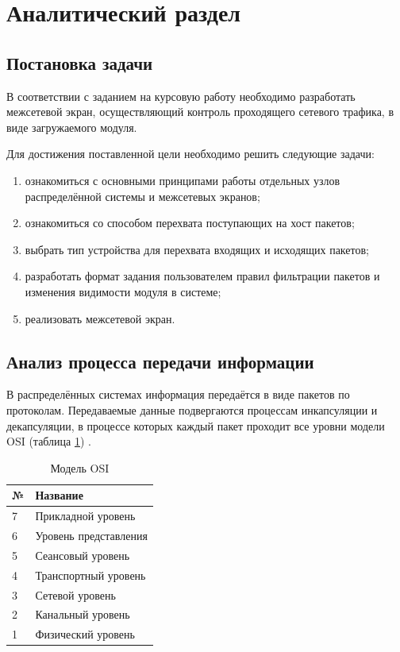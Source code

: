 \section{Аналитический раздел}

\subsection{Постановка задачи}\label{sec:task}
В соответствии с заданием на курсовую работу необходимо разработать межсетевой экран, осуществляющий контроль проходящего сетевого трафика, в виде загружаемого модуля.

Для достижения поставленной цели необходимо решить следующие задачи:
\begin{enumerate}
	\item ознакомиться с основными принципами работы отдельных узлов распределённой системы и межсетевых экранов;
	
	\item ознакомиться со способом перехвата поступающих на хост пакетов;
	
	\item выбрать тип устройства для перехвата входящих и исходящих пакетов;
	
	\item разработать формат задания пользователем правил фильтрации пакетов и изменения видимости модуля в системе;
	
	\item реализовать межсетевой экран. \newline
\end{enumerate}

\subsection{Анализ процесса передачи информации}
В распределённых системах информация передаётся в виде пакетов по протоколам. Передаваемые данные подвергаются процессам инкапсуляции и декапсуляции, в процессе которых каждый пакет проходит все уровни модели OSI (таблица \ref{osi_table}) \cite{net}.

\begin{table}[h]
	\begin{center}
		\caption{Модель OSI}
		\label{osi_table}
		\begin{tabular}{| p{1cm} | p{7cm} |}
			\hline
			\textbf{№} 	& \textbf{Название} \\
			\hline
			7 		& Прикладной уровень\\ 
			\hline
			6 		& Уровень представления  \\ 
			\hline
			5 		& Сеансовый уровень \\ 
			\hline
			4 		& Транспортный уровень \\ 
			\hline
			3 		& Сетевой уровень \\ 
			\hline
			2 		& Канальный уровень \\ 
			\hline
			1 		& Физический уровень \\ 
			\hline
		\end{tabular}
	\end{center}
\end{table} 

